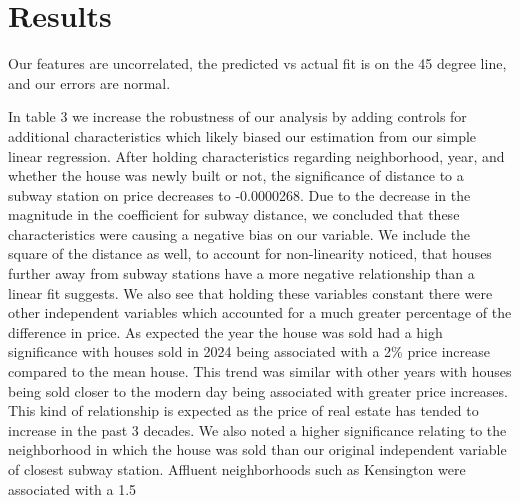 \section{Results}
\label{sec:results}
Our features are uncorrelated, the predicted vs actual fit is on the 45 degree line, and our errors are normal. 

In table 3 we increase the robustness of our analysis by adding controls for additional characteristics
 which likely biased our estimation from our simple linear regression. After holding characteristics regarding neighborhood,
  year, and whether the house was newly built or not, the significance of distance to a subway station on price decreases to
   -0.0000268. Due to the decrease in the magnitude  in the coefficient for subway distance, we concluded that these
    characteristics were causing a negative bias on our variable. We include the square of the distance as well,
     to account for non-linearity noticed, that houses further away from subway stations have a more negative
      relationship than a linear fit suggests.
We also see that holding these variables constant there were other independent variables which accounted for
 a much greater percentage of the difference in price. As expected the year the house was sold had a high
  significance with houses sold in 2024 being associated with a  2\% price increase compared to the mean house.
   This trend was similar with other years with houses being sold closer to the modern day being associated
    with greater price increases. This kind of relationship is expected as the price of real estate has tended
     to increase in the past 3 decades.
We also noted a higher significance relating to the neighborhood in which the house was sold than our original independent variable of closest subway station. Affluent neighborhoods such as Kensington were associated with a 1.5%
